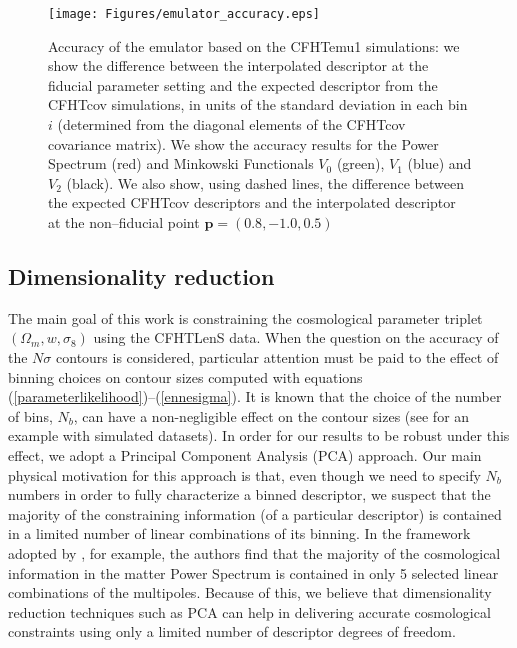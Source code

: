 \documentclass[reprint,aps,prd,superscriptaddress,showkeys,showpacs]{revtex4-1}
\begin{document}
\begin{figure}
\begin{center}
\texttt{[image: Figures/emulator\_accuracy.eps]}
\end{center}
\caption{Accuracy of the emulator based on the CFHTemu1 simulations: we show the difference between the interpolated descriptor at the fiducial parameter setting and the expected descriptor from the CFHTcov simulations, in units of the standard deviation in each bin $i$ (determined from the diagonal elements of the CFHTcov covariance matrix). We show the accuracy results for the Power Spectrum (red) and Minkowski Functionals $V_0$ (green), $V_1$ (blue) and $V_2$ (black). We also show, using dashed lines, the difference between the expected CFHTcov descriptors and the interpolated descriptor at the non--fiducial point $\mathbf{p}=(0.8,-1.0,0.5)$}
\label{emulatorAccuracy}
\end{figure}  

\subsection{Dimensionality reduction}
\label{pcasection}
The main goal of this work is constraining the cosmological parameter triplet $(\Omega_m,w,\sigma_8)$ using the CFHTLenS data. When the question on the accuracy of the $N\sigma$ contours is considered, particular attention must be paid to the effect of binning choices on contour sizes computed with equations (\ref{parameterlikelihood})--(\ref{ennesigma}). It is known that the choice of the number of bins, $N_b$, can have a non-negligible effect on the contour sizes (see \citep{Petri2013} for an example with simulated datasets). In order for our results to be robust under this effect, we adopt a Principal Component Analysis (PCA) approach. Our main physical motivation for this approach is that, even though we need to specify $N_b$ numbers in order to fully characterize a binned descriptor, we suspect that the majority of the constraining information (of a particular descriptor) is contained in a limited number of linear combinations of its binning. In the framework adopted by \citep{coyote2}, for example, the authors find that the majority of the cosmological information in the matter Power Spectrum is contained in only 5 selected linear combinations of the multipoles. Because of this, we believe that dimensionality reduction techniques such as PCA can help in delivering accurate cosmological constraints using only a limited number of descriptor degrees of freedom. 
\end{document}

